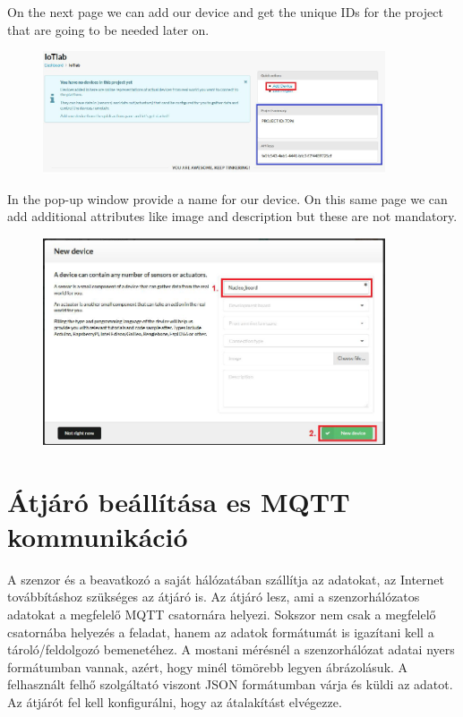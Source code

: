 \documentclass[a4paper]{article}
\begin{document}
On the next page we can add our device and get the unique IDs for the project that are going to be needed later on.

\begin{figure}[H]
    \centering
    \includegraphics[width=0.9\textwidth]{figures/devicehub-adddevice.png}
\end{figure}

In the pop-up window provide a name for our device. On this same page we can add additional attributes like image and description but these are not mandatory.

\begin{figure}[H]
    \centering
    \includegraphics[width=0.9\textwidth]{figures/devicehub-newdevice.png}
\end{figure}


\section{Átjáró beállítása es MQTT kommunikáció}
 
A szenzor és a beavatkozó a saját hálózatában szállítja az adatokat, az Internet továbbításhoz szükséges az átjáró is. Az átjáró lesz, ami a szenzorhálózatos adatokat a megfelelő MQTT csatornára helyezi. Sokszor nem csak a megfelelő csatornába helyezés a feladat, hanem az adatok formátumát is igazítani kell a tároló/feldolgozó bemenetéhez. A mostani mérésnél a szenzorhálózat adatai nyers formátumban vannak, azért, hogy minél tömörebb legyen ábrázolásuk. A felhasznált felhő szolgáltató viszont JSON formátumban várja és küldi az adatot. Az átjárót fel kell konfigurálni, hogy az átalakítást elvégezze.
\end{document}
